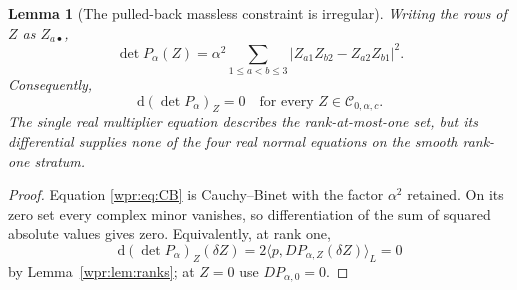 \documentclass[11pt]{article}
\newtheorem{lemma}[theorem]{Lemma}
\newcommand{\dd}{\mathrm d}
\begin{document}
\begin{lemma}[The pulled-back massless constraint is irregular]
\label{wpr:lem:irregular}
Writing the rows of \(Z\) as \(Z_{a\bullet}\),
\begin{equation}
 \det P_\alpha(Z)=
 \alpha^2\sum_{1\leq a<b\leq3}
 |Z_{a1}Z_{b2}-Z_{a2}Z_{b1}|^2.
 \label{wpr:eq:CB}
\end{equation}
Consequently,
\[
 \dd(\det P_\alpha)_Z=0
 \quad\text{for every }Z\in\mathcal C_{0,\alpha,c}.
\]
The single real multiplier equation describes the rank-at-most-one
set, but its differential supplies none of the four real normal
equations on the smooth rank-one stratum.
\end{lemma}
\begin{proof}
Equation \eqref{wpr:eq:CB} is Cauchy--Binet with the factor
\(\alpha^2\) retained.  On its zero set every complex minor vanishes,
so differentiation of the sum of squared absolute values gives zero.
Equivalently, at rank one,
\[
 \dd(\det P_\alpha)_Z(\delta Z)
 =2\langle p,D P_{\alpha,Z}(\delta Z)\rangle_L=0
\]
by Lemma~\ref{wpr:lem:ranks}; at \(Z=0\) use
\(D P_{\alpha,0}=0\).
\end{proof}
\end{document}
